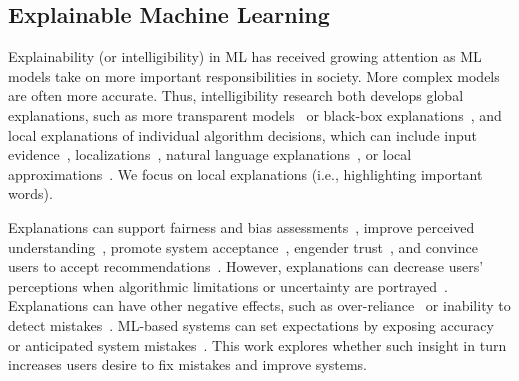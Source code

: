 \subsection{Explainable Machine Learning}
Explainability (or intelligibility) in ML has received growing
attention as ML models take on more important responsibilities in
society.
%
More complex models are often more accurate.
%
Thus, intelligibility research both develops global explanations, such as more transparent
models~\cite{caruana-kdd15,Alvarez-Melis2018TowardsNetworks,
Lage2018Human-in-the-loopPrior, Si2013LearningDetection} or black-box explanations~\cite{Lakkaraju2019FaithfulModels}, and local explanations of individual algorithm decisions, which can include
input evidence~\cite{Lei2016RationalizingPredictions,
Feng2019WhatPlay},
localizations~\cite{Selvaraju2017Grad-CAM:Localization,
Park2017AttentiveAbstract}, natural language
explanations~\cite{Camburu2018E-SNLI:Explanations,
Ehsan2019AutomatedPerceptions, Gkatzia2016NaturalInformation}, or
local approximations~\cite{Ribeiro2016WhyClassifier}.
%
We focus on local explanations (i.e., highlighting
important words).

Explanations can support
fairness and bias assessments~\cite{Dodge2019ExplainingJudgment}, improve perceived understanding~\cite{Kocielnik2019WillSystems},
promote system
acceptance~\cite{Herlocker2000ExplainingRecommendations}, engender
trust~\cite{Pu2006TrustInterfaces}, and convince users to accept
recommendations~\cite{Cramer2008TheRecommender}. However, explanations can decrease users' perceptions when algorithmic limitations or uncertainty
are portrayed~\cite{Cai2019TheInterface,
Stowers2017InsightsUncertainty, Lim2011InvestigatingApplications}.
%
Explanations can have other negative effects, such as over-reliance~\cite{Stumpf2016ExplanationsSystems} or inability to detect
mistakes~\cite{Poursabzi-Sangdeh2018ManipulatingInterpretability}.
%
ML-based systems can set expectations by exposing accuracy~\cite{Yin2019UnderstandingModels} or anticipated system mistakes~\cite{Kocielnik2019WillSystems}. This work explores whether such insight in turn increases users desire to fix mistakes and improve systems.
%


